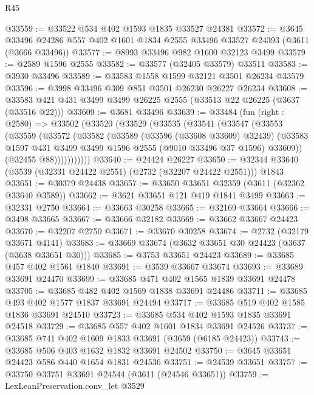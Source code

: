 \begin{lexlean}{R45}
\begin{coremodule}
@33559 := @33522 @534 @402 @1593 @1835 @33527 @24381
@33572 := @3645
    @33496
    @24286
    @557
    @402
    @1601
    @1834
    @2555
    @33496
    @33527
    @24393
    (@3611 (@3666 @33496))
@33577 := @8993 @33496 @982 @1600 @32123 @3499
@33579 := @2589 @1596 @2555
@33582 := @33577 (@32405 @33579) @33511
@33583 := @3930 @33496
@33589 := @33583 @1558 @1599 @32121 @3501 @26234 @33579
@33596 := @3998 @33496 @309 @851 @3501 @26230 @26227 @26234
@33608 := @33583 @421 @431 @3499 @3499 @26225 @2555 (@33513 @22 @26225 (@3637 (@33516 @22)))
@33609 := @3681 @33496
@33639 := @33484
    (fun (right : @2580) =>
    @33502
      (@33520
        (@33529
          (@33535
            (@33541
              (@33547
                (@33553
                  (@33559
                    (@33572
                      (@33582
                        (@33589
                          (@33596 (@33608 @33609) @32439)
                          (@33583
                            @1597
                            @431
                            @3499
                            @3499
                            @1596
                            @2555
                            (@9010 @33496 @37 @1596)
                            @33609))
                        (@32455 @88)))))))))))
@33640 := @24424 @26227
@33650 := @32344 @33640 (@3539 (@32331 @24422 @2551) (@2732 (@32207 @24422 @2551))) @1843
@33651 := @30379 @24438
@33657 := @33650 @33651 @32359 (@3611 (@32362 @33640 @3589))
@33662 := @3621 @33651 @121 @419 @1841 @3499
@33663 := @32331 @2750
@33664 := @33663 @30258
@33665 := @32169 @33664
@33666 := @3498 @33665
@33667 := @33666 @32182
@33669 := @33662 @33667 @24423
@33670 := @32207 @2750
@33671 := @33670 @30258
@33674 := @2732 (@32179 @33671 @4141)
@33683 := @33669 @33674 (@3632 @33651 @30 @24423 (@3637 (@3638 @33651 @30)))
@33685 := @3753 @33651 @24423
@33689 := @33685 @457 @402 @1561 @1840
@33691 := @3539 @33667 @33674
@33693 := @33689 @33691 @24470
@33699 := @33685 @471 @402 @1565 @1839 @33691 @24478
@33705 := @33685 @482 @402 @1569 @1838 @33691 @24486
@33711 := @33685 @493 @402 @1577 @1837 @33691 @24494
@33717 := @33685 @519 @402 @1585 @1836 @33691 @24510
@33723 := @33685 @534 @402 @1593 @1835 @33691 @24518
@33729 := @33685 @557 @402 @1601 @1834 @33691 @24526
@33737 := @33685 @741 @402 @1609 @1833 @33691 (@3659 (@6185 @24423))
@33743 := @33685 @506 @403 @1632 @1832 @33691 @24502
@33750 := @3645 @33651 @24423 @586 @440 @1654 @1831 @24536
@33751 := @24539 @33651
@33757 := @33750 @33751 @33691 @24544 (@3611 (@24546 @33651))
@33759 := LexLeanPreservation.conv_let @3529

\end{coremodule}
\end{lexlean}
